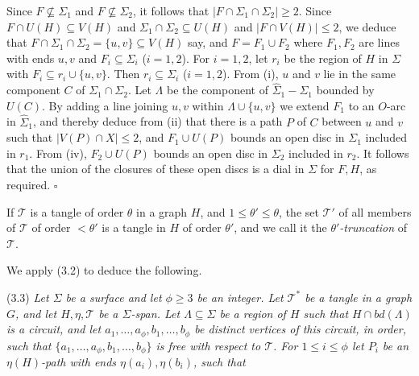 Since $F \not\subseteq \Sigma_1$ and $F \not\subseteq \Sigma_2$, it follows that $|F \cap \Sigma_1 \cap \Sigma_2| \ge 2$. Since $F \cap U(H) \subseteq V(H)$ and $\Sigma_1 \cap \Sigma_2 \subseteq U(H)$ and $|F \cap V(H)| \le 2$, we deduce that $F \cap \Sigma_1 \cap \Sigma_2 = \{u, v\} \subseteq V(H)$ say, and $F = F_1 \cup F_2$ where $F_1, F_2$ are lines with ends $u, v$ and $F_i \subseteq \Sigma_i$ ($i = 1, 2$). For $i = 1, 2$, let $r_i$ be the region of $H$ in $\Sigma$ with $F_i \subseteq r_i \cup \{u, v\}$. Then $r_i \subseteq \Sigma_i$ ($i = 1, 2$). From (i), $u$ and $v$ lie in the same component $C$ of $\Sigma_1 \cap \Sigma_2$. Let $\Lambda$ be the component of $\hat{\Sigma}_1 - \Sigma_1$ bounded by $U(C)$. By adding a line joining $u, v$ within $\Lambda \cup \{u, v\}$ we extend $F_1$ to an $O$-arc in $\hat{\Sigma}_1$, and thereby deduce from (ii) that there is a path $P$ of $C$ between $u$ and $v$ such that $|V(P) \cap X| \le 2$, and $F_1 \cup U(P)$ bounds an open disc in $\Sigma_1$ included in $r_1$. From (iv), $F_2 \cup U(P)$ bounds an open disc in $\Sigma_2$ included in $r_2$. It follows that the union of the closures of these open discs is a dial in $\Sigma$ for $F, H$, as required. $\square$

If $\mathscr{T}$ is a tangle of order $\theta$ in a graph $H$, and $1 \le \theta' \le \theta$, the set $\mathscr{T}'$ of all members of $\mathscr{T}$ of order $< \theta'$ is a tangle in $H$ of order $\theta'$, and we call it the \textit{$\theta'$-truncation} of $\mathscr{T}$.

We apply (3.2) to deduce the following.

\stmt
(3.3) \textit{Let $\Sigma$ be a surface and let $\phi \ge 3$ be an integer. Let $\mathscr{T}^*$ be a tangle in a graph $G$, and let $H, \eta, \mathscr{T}$ be a $\Sigma$-span. Let $\Lambda \subseteq \Sigma$ be a region of $H$ such that $H \cap bd(\Lambda)$ is a circuit, and let $a_1, \dots, a_\phi, b_1, \dots, b_\phi$ be distinct vertices of this circuit, in order, such that $\{a_1, \dots, a_\phi, b_1, \dots, b_\phi\}$ is free with respect to $\mathscr{T}$. For $1 \le i \le \phi$ let $P_i$ be an $\eta(H)$-path with ends $\eta(a_i), \eta(b_i)$, such that}
